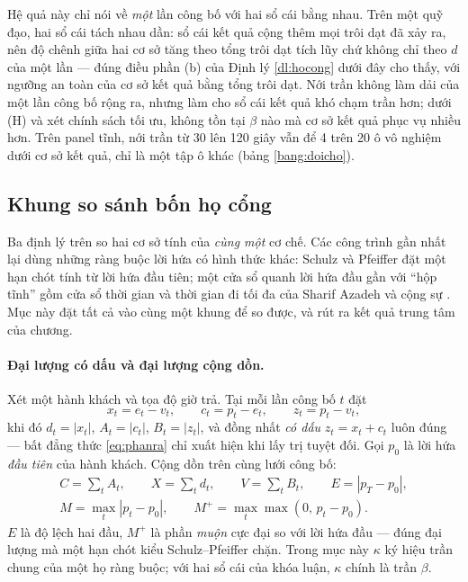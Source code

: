 Hệ quả này chỉ nói về \emph{một} lần công bố với hai sổ cái bằng nhau. Trên một quỹ đạo, hai sổ
cái tách nhau dần: sổ cái kết quả cộng thêm mọi trôi dạt đã xảy ra, nên độ chênh giữa hai cơ sở tăng
theo tổng trôi dạt tích lũy chứ không chỉ theo $d$ của một lần --- đúng điều phần (b) của Định lý
\ref{dl:hocong} dưới đây cho thấy, với ngưỡng an toàn của cơ sở kết quả bằng tổng trôi dạt. Nới trần
không làm dải của một lần công bố rộng ra, nhưng làm cho sổ cái kết quả khó chạm trần hơn; dưới (H)
và xét chính sách tối ưu, không tồn tại $\beta$ nào mà cơ sở kết quả phục vụ nhiều hơn. Trên panel
tĩnh, nới trần từ 30 lên 120 giây vẫn để 4 trên 20 ô vô nghiệm dưới cơ sở kết quả, chỉ là một tập ô
khác (bảng \ref{bang:doicho}).

\subsection{Khung so sánh bốn họ cổng}
\label{muc:hocong}

Ba định lý trên so hai cơ sở tính của \emph{cùng một} cơ chế. Các công trình gần nhất lại dùng
những ràng buộc lời hứa có hình thức khác: Schulz và Pfeiffer \cite{schulz2026} đặt một hạn chót
tính từ lời hứa đầu tiên; một cửa sổ quanh lời hứa đầu gần với ``hộp tĩnh'' gồm cửa sổ thời gian
và thời gian đi tối đa của Sharif Azadeh và cộng sự \cite{sharifazadeh2022}. Mục này đặt tất cả
vào cùng một khung để so được, và rút ra kết quả trung tâm của chương.

\paragraph{Đại lượng có dấu và đại lượng cộng dồn.} Xét một hành khách và tọa độ giờ trả. Tại mỗi
lần công bố $t$ đặt
\begin{equation}
x_t = e_t - v_t, \qquad c_t = p_t - e_t, \qquad z_t = p_t - v_t,
\end{equation}
khi đó $d_t = |x_t|$, $A_t = |c_t|$, $B_t = |z_t|$, và đồng nhất \emph{có dấu} $z_t = x_t + c_t$
luôn đúng --- bất đẳng thức \eqref{eq:phanra} chỉ xuất hiện khi lấy trị tuyệt đối. Gọi $p_0$ là
lời hứa \emph{đầu tiên} của hành khách. Cộng dồn trên cùng lưới công bố:
\begin{gather}
C = \sum_t A_t, \qquad X = \sum_t d_t, \qquad V = \sum_t B_t, \qquad E = |p_T - p_0|,\\
M = \max_t |p_t - p_0|, \qquad M^{+} = \max_t \max(0,\, p_t - p_0).
\end{gather}
$E$ là độ lệch hai đầu, $M^{+}$ là phần \emph{muộn} cực đại so với lời hứa đầu --- đúng đại lượng mà
một hạn chót kiểu Schulz--Pfeiffer chặn. Trong mục này $\kappa$ ký hiệu trần chung của một họ ràng
buộc; với hai sổ cái của khóa luận, $\kappa$ chính là trần $\beta$.

